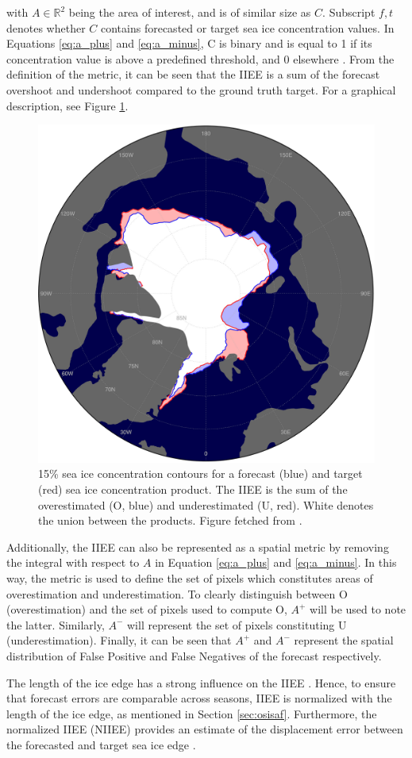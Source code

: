 \documentclass[../main/thesis.tex]{subfiles}
\begin{document}
with $A \in{\mathbb{R}^2}$ being the area of interest, and is of similar size as $C$. Subscript $f,t$ denotes whether $C$ contains forecasted or target sea ice concentration values. In Equations \ref{eq:a_plus} and \ref{eq:a_minus}, C is binary and is equal to 1 if its concentration value is above a predefined threshold, and 0 elsewhere \citep{Goessling2016}. From the definition of the metric, it can be seen that the IIEE is a sum of the forecast overshoot and undershoot compared to the ground truth target. For a graphical description, see Figure \ref{fig:goessling_iiee}.

\begin{figure}
    \centering
    \includegraphics[width=.4\textwidth]{goessling_iiee}
    \caption{\label{fig:goessling_iiee}15\% sea ice concentration contours for a forecast (blue) and target (red) sea ice concentration product. The IIEE is the sum of the overestimated (O, blue) and underestimated (U, red). White denotes the union between the products. Figure fetched from \protect\citet{Goessling2016}.}
\end{figure}

Additionally, the IIEE can also be represented as a spatial metric by removing the integral with respect to $A$ in Equation \ref{eq:a_plus} and \ref{eq:a_minus}. In this way, the metric is used to define the set of pixels which constitutes areas of overestimation and underestimation. To clearly distinguish between O (overestimation) and the set of pixels used to compute O, $A^+$ will be used to note the latter. Similarly, $A^-$ will represent the set of pixels constituting U (underestimation). Finally, it can be seen that $A^+$ and $A^-$ represent the spatial distribution of False Positive and False Negatives of the forecast respectively.

The length of the ice edge has a strong influence on the IIEE \citep{Goessling2018,Palerme2019}. Hence, to ensure that forecast errors are comparable across seasons, IIEE is normalized with the length of the ice edge, as mentioned in Section \ref{sec:osisaf}. Furthermore, the normalized IIEE (NIIEE) provides an estimate of the displacement error between the forecasted and target sea ice edge \citep{Melsom2019}.
\end{document}
